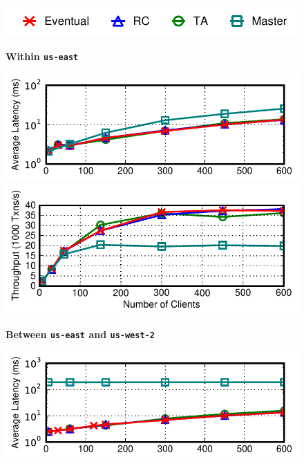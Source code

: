 \begin{figure}[t!]
\begin{center}
\hspace{2em}\includegraphics[width=.8\columnwidth]{figs/strategylegend.pdf}
\end{center}\vspace{-2em}
\begin{center}\textbf{Within \texttt{us-east}}\end{center}\vspace{-1.5em}
\includegraphics[width=0.90\columnwidth]{figs/lan-threads-lats.pdf}\vspace{-1em}
\includegraphics[width=0.90\columnwidth]{figs/lan-threads-thru.pdf}
\begin{center}\textbf{Between \texttt{us-east} and \texttt{us-west-2}}\end{center}\vspace{-1.5em}
\includegraphics[width=0.90\columnwidth]{figs/wan-threads-lats.pdf}\vspace{-1em}

\end{figure}
